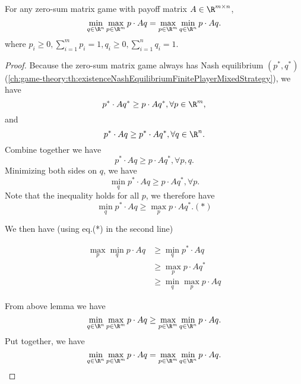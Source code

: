 \begin{refsection}
\begin{theorem}\label{ch:game-theory:th:EquivalenceBetweenMinmaxMaxminZeroSumMatrixGame}
	For any zero-sum matrix game with payoff matrix $A\in \R^{m\times n}$, 
	$$\min_{q\in \R^n} \max_{p\in \R^m} p\cdot Aq =  \max_{p\in \R^m}  \min_{q\in \R^n} p\cdot Aq.$$	
			where $p_i \geq 0, \sum_{i=1}^m p_i = 1,q_i \geq 0, \sum_{i=1}^n q_i = 1.$
\end{theorem}
\begin{proof}
Because the zero-sum matrix game always has Nash equilibrium $(p^*,q^*)$(\autoref{ch:game-theory:th:existenceNashEquilibriumFinitePlayerMixedStrategy}), we have 
$$p^*\cdot A q^* \geq p \cdot A q^*, \forall p \in \R^m,$$ 	
and
$$p^*\cdot A q \geq p^* \cdot A q^*, \forall q \in \R^n.$$ 	
Combine together we have
$$p^*\cdot A q \geq  p \cdot A q^*, \forall p, q.$$
Minimizing both sides on $q$, we have
$$\min_{q}p^*\cdot A q \geq  p \cdot A q^*, \forall p.$$
Note that the inequality holds for all $p$, we therefore have
$$\min_{q}p^*\cdot A q \geq  \max_{p} p \cdot A q^*.(*)$$

We then have (using eq.(*) in the second line)

\begin{align*}
\max_p\min_q p\cdot A q &\geq \min_q p^* \cdot A q \\
						&\geq \max_p p \cdot A q^* \\
						&\geq \min_q\max_p p \cdot A q
\end{align*}

From above lemma we have $$\min_{q\in \R^n} \max_{p\in \R^m} p\cdot Aq \geq  \max_{p\in \R^m}  \min_{q\in \R^n} p\cdot Aq.$$
Put together, we have
$$\min_{q\in \R^n} \max_{p\in \R^m} p\cdot Aq =  \max_{p\in \R^m}  \min_{q\in \R^n} p\cdot Aq .$$

\end{proof}




\end{refsection}
